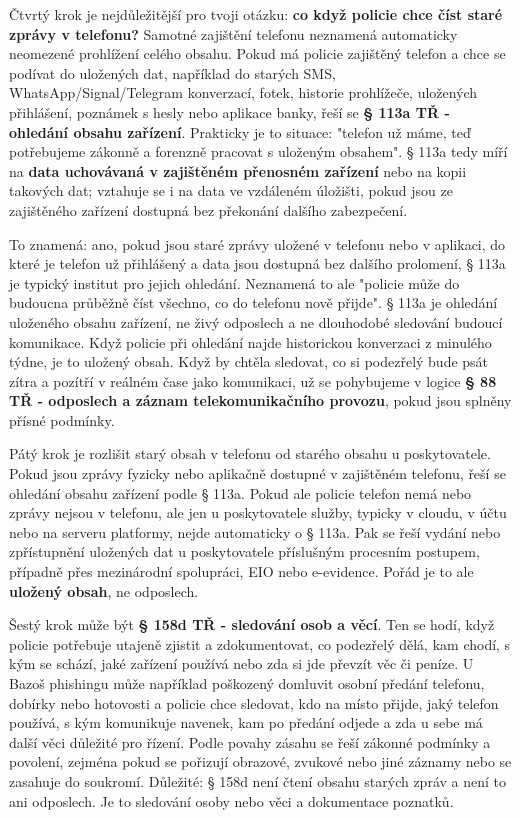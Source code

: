 {Čtvrtý krok je nejdůležitější pro tvoji otázku: \textbf{co když policie chce číst staré zprávy v telefonu?} Samotné zajištění telefonu neznamená automaticky neomezené prohlížení celého obsahu. Pokud má policie zajištěný telefon a chce se podívat do uložených dat, například do starých SMS, WhatsApp/Signal/Telegram konverzací, fotek, historie prohlížeče, uložených přihlášení, poznámek s hesly nebo aplikace banky, řeší se \textbf{§ 113a TŘ - ohledání obsahu zařízení}. Prakticky je to situace: "telefon už máme, teď potřebujeme zákonně a forenzně pracovat s uloženým obsahem". § 113a tedy míří na \textbf{data uchovávaná v zajištěném přenosném zařízení} nebo na kopii takových dat; vztahuje se i na data ve vzdáleném úložišti, pokud jsou ze zajištěného zařízení dostupná bez překonání dalšího zabezpečení.

To znamená: ano, pokud jsou staré zprávy uložené v telefonu nebo v aplikaci, do které je telefon už přihlášený a data jsou dostupná bez dalšího prolomení, § 113a je typický institut pro jejich ohledání. Neznamená to ale "policie může do budoucna průběžně číst všechno, co do telefonu nově přijde". § 113a je ohledání uloženého obsahu zařízení, ne živý odposlech a ne dlouhodobé sledování budoucí komunikace. Když policie při ohledání najde historickou konverzaci z minulého týdne, je to uložený obsah. Když by chtěla sledovat, co si podezřelý bude psát zítra a pozítří v reálném čase jako komunikaci, už se pohybujeme v logice \textbf{§ 88 TŘ - odposlech a záznam telekomunikačního provozu}, pokud jsou splněny přísné podmínky.

Pátý krok je rozlišit starý obsah v telefonu od starého obsahu u poskytovatele. Pokud jsou zprávy fyzicky nebo aplikačně dostupné v zajištěném telefonu, řeší se ohledání obsahu zařízení podle § 113a. Pokud ale policie telefon nemá nebo zprávy nejsou v telefonu, ale jen u poskytovatele služby, typicky v cloudu, v účtu nebo na serveru platformy, nejde automaticky o § 113a. Pak se řeší vydání nebo zpřístupnění uložených dat u poskytovatele příslušným procesním postupem, případně přes mezinárodní spolupráci, EIO nebo e-evidence. Pořád je to ale \textbf{uložený obsah}, ne odposlech.

Šestý krok může být \textbf{§ 158d TŘ - sledování osob a věcí}. Ten se hodí, když policie potřebuje utajeně zjistit a zdokumentovat, co podezřelý dělá, kam chodí, s kým se schází, jaké zařízení používá nebo zda si jde převzít věc či peníze. U Bazoš phishingu může například poškozený domluvit osobní předání telefonu, dobírky nebo hotovosti a policie chce sledovat, kdo na místo přijde, jaký telefon používá, s kým komunikuje navenek, kam po předání odjede a zda u sebe má další věci důležité pro řízení. Podle povahy zásahu se řeší zákonné podmínky a povolení, zejména pokud se pořizují obrazové, zvukové nebo jiné záznamy nebo se zasahuje do soukromí. Důležité: § 158d není čtení obsahu starých zpráv a není to ani odposlech. Je to sledování osoby nebo věci a dokumentace poznatků.

}
